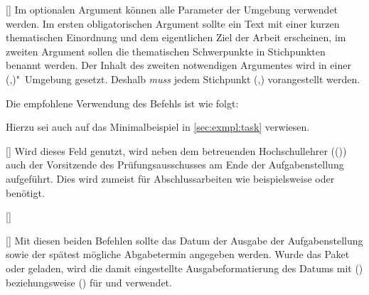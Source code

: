 \begin{Entity*}{}
\begin{Declaration}{[\OList{}]}
Im optionalen Argument können alle Parameter der Umgebung  
verwendet werden. Im ersten obligatorischen Argument sollte ein Text mit einer 
kurzen thematischen Einordnung und dem eigentlichen Ziel der Arbeit erscheinen, 
im zweiten Argument sollen die thematischen Schwerpunkte in Stichpunkten 
benannt werden. Der Inhalt des zweiten notwendigen Argumentes wird in einer 
(,)"~Umgebung
gesetzt. Deshalb \emph{muss} jedem Stichpunkt 
(,) vorangestellt 
werden.
\end{Declaration}
%
\begin{Example}
Die empfohlene Verwendung des Befehls  ist wie folgt:
\begin{Code}[escapechar=§]
\end{Code}
Hierzu sei auch auf das Minimalbeispiel in \autoref{sec:exmpl:task} verwiesen.%
%
\end{Example}

\begin{Declaration}{[]}
\printdeclarationlist%
%
Wird dieses Feld genutzt, wird neben dem betreuenden Hochschullehrer 
(()) auch der Vorsitzende des Prüfungsausschusses am Ende der 
Aufgabenstellung aufgeführt. Dies wird zumeist für Abschlussarbeiten wie 
beispielsweise \masterthesisname{} oder \diplomathesisname{} benötigt.
\end{Declaration}

\begin{Declaration}{[]}
\begin{Declaration}{[]}
\printdeclarationlist%
%
Mit diesen beiden Befehlen sollte das Datum der Ausgabe der Aufgabenstellung 
sowie der spätest mögliche Abgabetermin angegeben werden. Wurde das Paket 
 oder  geladen, wird die damit eingestellte 
Ausgabeformatierung des Datums mit () 
beziehungsweise () für  und 
 verwendet.
\end{Declaration}
\end{Declaration}




\end{Entity*}
